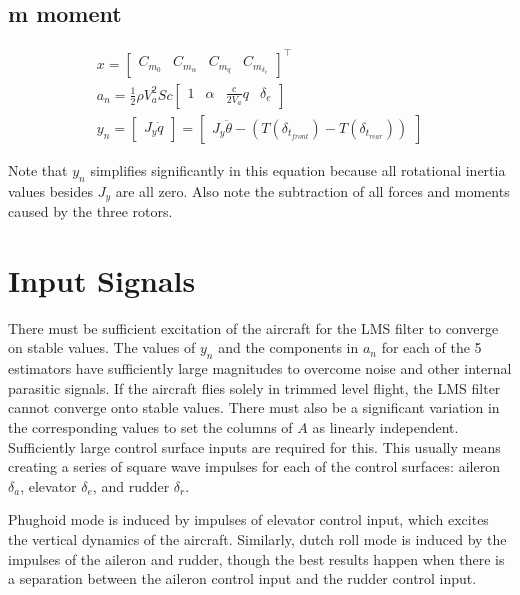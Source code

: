 \subsection{m moment}

\begin{align}
    x =
    \begin{bmatrix}
        C_{m_0} & C_{m_\alpha} & C_{m_q} & C_{m_{\delta_e}}
    \end{bmatrix}^\top\\
    a_n = \frac{1}{2} \rho V_a^2 S c
    \begin{bmatrix}
        1 & \alpha & \frac{c}{2V_a} q & \delta_e
    \end{bmatrix}\\
    y_n = 
    \begin{bmatrix}
        J_y \dot{q}
    \end{bmatrix}
    =
    \begin{bmatrix}
        J_y \ddot{\theta} - (T(\delta_{t_{front}}) - T(\delta_{t_{rear}}))
    \end{bmatrix}
\end{align}

Note that $y_n$ simplifies significantly in this equation because all rotational inertia values besides $J_y$ are all zero. 
Also note the subtraction of all forces and moments caused by the three rotors.

\section{Input Signals}

There must be sufficient excitation of the aircraft for the LMS filter to converge on stable values. 
The values of $y_n$ and the components in $a_n$ for each of the 5 estimators have sufficiently large magnitudes to overcome noise and other internal parasitic signals. 
If the aircraft flies solely in trimmed level flight, the LMS filter cannot converge onto stable values. 
There must also be a significant variation in the corresponding values to set the columns of $A$ as linearly independent. 
Sufficiently large control surface inputs are required for this. 
This usually means creating a series of square wave impulses for each of the control surfaces: aileron $\delta_a$, elevator $\delta_e$, and rudder $\delta_r$. 

Phughoid mode is induced by impulses of elevator control input, which excites the vertical dynamics of the aircraft. 
Similarly, dutch roll mode is induced by the impulses of the aileron and rudder, though the best results happen when there is a separation between the aileron control input and the rudder control input.

